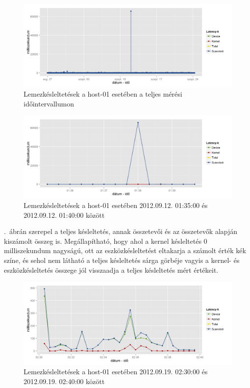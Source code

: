 \documentclass[a4paper,10pt,titlepage]{article}
\begin{document}
\begin{figure}[ht!]
\centering
\includegraphics[width=1.00\textwidth]{figures/disk_metrics_sumlatency-20120826230140-20120924083120.png}
\caption{ Lemezkésleltetések a host-01 esetében a teljes mérési időintervallumon \label{fig:disk_metrics_sumlatency-01}}
\end{figure}

\begin{figure}[ht!]
\centering
\includegraphics[width=1.00\textwidth]{figures/disk_metrics_sumlatency-20120912013500-20120912014000.png}
\caption{ Lemezkésleltetések a host-01 esetében 2012.09.12. 01:35:00 és 2012.09.12. 01:40:00 között \label{fig:disk_metrics_sumlatency-02}}
\end{figure}

.~ábrán szerepel a teljes késleltetés, annak összetevői és az összetevők alapján kiszámolt összeg is. Megállapítható, hogy ahol a kernel késleltetés 0 milliszekundum nagyságú, ott az eszközkésleltetést eltakarja a számolt érték kék színe, és sehol nem látható a teljes késleltetés sárga görbéje vagyis a kernel- és eszközkésleltetés összege jól visszaadja a teljes késleltetés mért értékeit.

\begin{figure}[ht!]
\centering
\includegraphics[width=1.00\textwidth]{figures/disk_metrics_sumlatency-20120919023000-20120919024000.png}
\caption{ Lemezkésleltetések a host-01 esetében 2012.09.19. 02:30:00 és 2012.09.19. 02:40:00 között \label{fig:disk_metrics_sumlatency-03}}
\end{figure}
\end{document}
